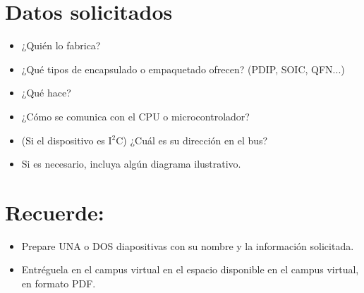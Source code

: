 \documentclass[letterpaper,10pt]{article}
\begin{document}

\section{Datos solicitados}
\begin{small}
\begin{itemize}
\item ¿Quién lo fabrica?
\item ¿Qué tipos de encapsulado o empaquetado ofrecen? (PDIP, SOIC, QFN...)
\item ¿Qué hace?
\item ¿Cómo se comunica con el CPU o microcontrolador?
\item (Si el dispositivo es I$^2$C) ¿Cuál es su dirección en el bus?
\item Si es necesario, incluya algún diagrama ilustrativo.
\end{itemize}
\end{small}

\section{Recuerde:}
\begin{small}
\begin{itemize}
\item Prepare UNA o DOS diapositivas con su nombre y la información solicitada. 

\item Entréguela en el campus virtual en el espacio disponible en el campus virtual, en formato PDF.
\end{itemize}
\end{small}
\end{document}
